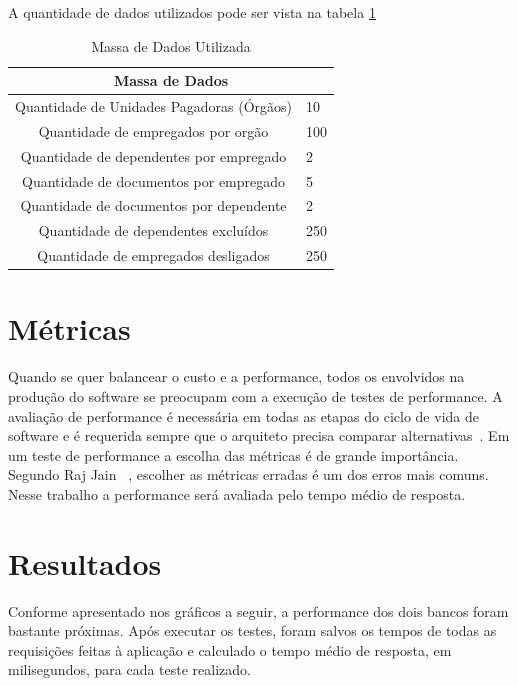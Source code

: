 A quantidade de dados utilizados pode ser vista na tabela \ref{tab:massadadosutil}

\begin{table}
	\caption{Massa de Dados Utilizada}
	\begin{center}
	\begin{tabularx}{\textwidth}{ | c | X | }
	\hline
		\multicolumn{2}{|c|}{\textbf{Massa de Dados}} \\
	\hline
		Quantidade de Unidades Pagadoras (Órgãos) &  10\\
	\hline
		Quantidade de empregados por orgão & 100\\
	\hline 
		Quantidade de dependentes por empregado & 2 \\
	\hline
		Quantidade de documentos por empregado & 5\\
	\hline
		Quantidade de documentos por dependente & 2\\
	\hline
		Quantidade de dependentes excluídos & 250\\
	\hline
		Quantidade de empregados desligados & 250\\
	\hline
	\end {tabularx}
	\end{center}
	\label{tab:massadadosutil}
\end{table}

\section{Métricas}

Quando se quer balancear o custo e a performance, todos os envolvidos na produção do software se preocupam com a execução de testes de performance. A avaliação de performance é necessária em todas as etapas do ciclo de vida de software e é requerida sempre que o arquiteto precisa comparar alternativas~\cite{rajjain}. Em um teste de performance a escolha das métricas é de grande importância. Segundo Raj Jain ~\cite{rajjain}, escolher as métricas erradas é um dos erros mais comuns. Nesse trabalho a performance será avaliada pelo tempo médio de resposta.

\section{Resultados}

Conforme apresentado nos gráficos a seguir, a performance dos dois bancos foram bastante próximas. Após executar os testes, foram salvos os tempos de todas as requisições feitas à aplicação e calculado o tempo médio de resposta, em milisegundos, para cada teste realizado.

